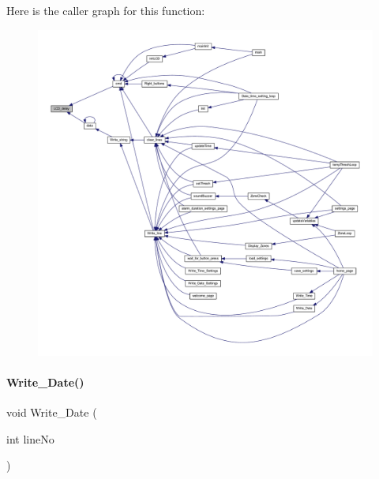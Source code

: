 Here is the caller graph for this function\+:
\nopagebreak
\begin{figure}[H]
\begin{center}
\leavevmode
\includegraphics[width=350pt]{a00032_a43354028a3c697c67905dc7e55e6de8d_icgraph}
\end{center}
\end{figure}
\mbox{\label{a00032_a897e97006c9f0d112306aac62288d408}} 
\paragraph{Write\+\_\+\+Date()}
{\footnotesize\ttfamily void Write\+\_\+\+Date (\begin{DoxyParamCaption}\item[{int}]{line\+No }\end{DoxyParamCaption})}

